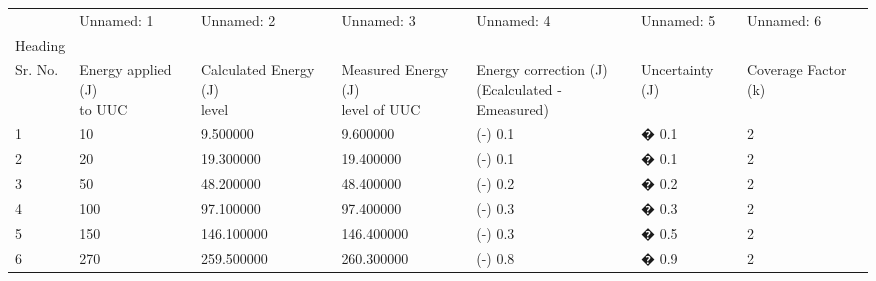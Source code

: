 \begin{tabular}{lllllll}
\toprule
 & Unnamed: 1 & Unnamed: 2 & Unnamed: 3 & Unnamed: 4 & Unnamed: 5 & Unnamed: 6 \\
Heading &  &  &  &  &  &  \\
\midrule
Sr. No. & \cellbreak{Energy applied (J)\\ to UUC} &  \cellbreak{Calculated Energy (J)\\ level} &  \cellbreak{Measured Energy (J)\\ level of UUC} &  \cellbreak{Energy correction (J)\\ (Ecalculated - Emeasured)} & Uncertainty (J) & Coverage Factor (k) \\
1 & 10 & 9.500000 & 9.600000 & (-) 0.1 & � 0.1 & 2 \\
2 & 20 & 19.300000 & 19.400000 & (-) 0.1 & � 0.1 & 2 \\
3 & 50 & 48.200000 & 48.400000 & (-) 0.2 & � 0.2 & 2 \\
4 & 100 & 97.100000 & 97.400000 & (-) 0.3 & � 0.3 & 2 \\
5 & 150 & 146.100000 & 146.400000 & (-) 0.3 & � 0.5 & 2 \\
6 & 270 & 259.500000 & 260.300000 & (-) 0.8 & � 0.9 & 2 \\
\bottomrule
\end{tabular}
